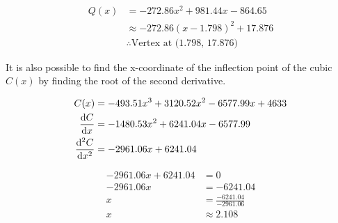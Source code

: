 \documentclass[12pt, a4paper]{article}
\begin{document}
\begin{align*}
    Q(x) &= -272.86x^2 + 981.44x -864.65 \\
         &\approx -272.86(x - 1.798)^2 + 17.876 \\
         &\therefore \text{Vertex at (1.798, 17.876)}
\end{align*}

It is also possible to find the x-coordinate of the inflection point of the
cubic $C(x)$ by finding the root of the second derivative.

\begin{align*}
        C(x) &= -493.51x^3+3120.52x^2-6577.99x+4633 \\
        \dv{C}{x} &= -1480.53x^2+6241.04x-6577.99 \\
        \dv[2]{C}{x} &= -2961.06x + 6241.04
\end{align*}

\begin{align*}
    -2961.06x + 6241.04 &= 0 \\
    -2961.06x  &= -6241.04 \\
    x &= \frac{-6241.04}{-2961.06} \\
    x &\approx 2.108
\end{align*}
\end{document}
